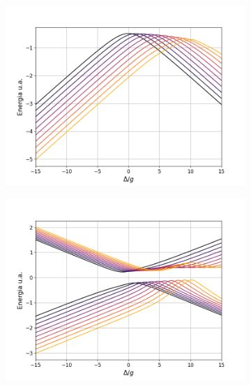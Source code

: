 \begin{figure}
    \centering
    \begin{subfigure}{0.49\textwidth}
        \includegraphics[width=\textwidth]{figuras/ch4/omega12 2d chi.png}
        \caption{}
        \label{fig4:rabi 1 chi}
    \end{subfigure}
    \hfill
    \begin{subfigure}{0.49\textwidth}
        \includegraphics[width=\textwidth]{figuras/ch4/omega23 2d chi.png}
        \caption{}
        \label{fig4:rabi 2 chi}
    \end{subfigure}
    \vfill
    \begin{subfigure}{0.49\textwidth}

\end{subfigure}
\end{figure}

